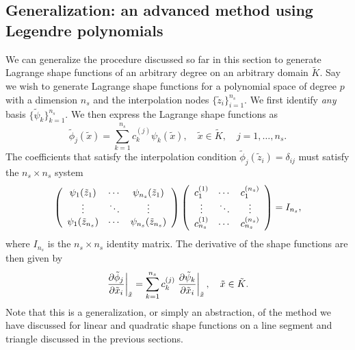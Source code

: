 \subsection{Generalization: an advanced method using Legendre polynomials}
\label{sec:fe_gen_shape}
We can generalize the procedure discussed so far in this section to generate Lagrange shape functions of an arbitrary degree on an arbitrary domain $\tilde K$.  Say we wish to generate Lagrange shape functions for a polynomial space of degree $p$ with a dimension $n_s$ and the interpolation nodes $\{ \tilde z_i \}_{i=1}^{n_s}$.  We first identify \emph{any} basis $\{ \tilde \psi_k \}_{k=1}^{n_s}$.  We then express the Lagrange shape functions as
\begin{equation}
  \tilde \phi_j(\tilde x) = \sum_{k=1}^{n_s} c^{(j)}_k \psi_k(\tilde x), \quad \tilde x \in \tilde K, \quad j = 1,\dots,n_s.
  \label{eq:fe_gen_val_rep}
\end{equation}
The coefficients that satisfy the interpolation condition $\tilde \phi_j(\tilde z_i) = \delta_{ij}$ must satisfy the $n_s \times n_s$ system
\begin{align}
  \bmat{ccc}
  \psi_1(\tilde z_1) & \cdots & \psi_{n_s}(\tilde z_1) \\
  \vdots & \ddots & \vdots \\
  \psi_1(\tilde z_{n_s}) & \cdots & \psi_{n_s}(\tilde z_{n_s}) 
  \emat
  \bmat{ccc}
  c^{(1)}_1 & \cdots & c^{(n_s)}_1 \\
  \vdots & \ddots & \vdots \\
  c^{(1)}_{n_s} & \cdots & c^{(n_s)}_{n_s}
  \emat
  =
  I_{n_s},
  \label{eq:fe_gen_coeff_sys}
\end{align}
where $I_{n_s}$ is the $n_s \times n_s$ identity matrix. The derivative of the shape functions are then given by
\begin{equation}
  \left. \pp{\tilde \phi_j}{\tilde x_i} \right|_{\tilde x}
  = \sum_{k=1}^{n_s} c^{(j)}_k \left. \pp{\tilde \psi_k}{\tilde x_i} \right|_{\tilde x}, \quad \tilde x \in \tilde K.
  \label{eq:fe_gen_der_rep}
\end{equation}
Note that this is a generalization, or simply an abstraction, of the method we have discussed for linear and quadratic shape functions on a line segment and triangle discussed in the previous sections.

